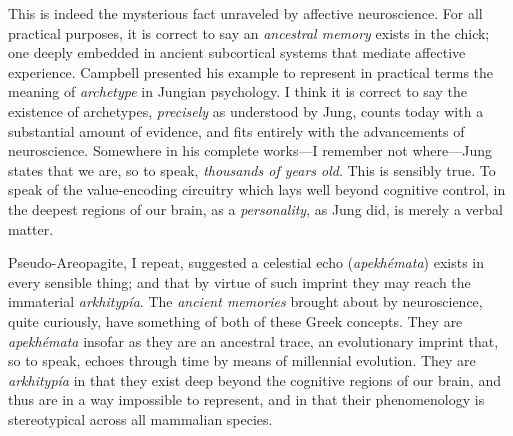 \documentclass[a4paper]{article}
\begin{document}
This is indeed the mysterious fact unraveled by affective neuroscience. For all
practical purposes, it is correct to say an \textit{ancestral memory} exists in
the chick; one deeply embedded in ancient subcortical systems that mediate
affective experience. Campbell presented his example to represent in practical
terms the meaning of \textit{archetype} in Jungian psychology. I think it is
correct to say the existence of archetypes, \textit{precisely} as understood by
Jung, counts today with a substantial amount of evidence, and fits entirely with
the advancements of neuroscience. Somewhere in his complete works---I remember
not where---Jung states that we are, so to speak, \textit{thousands of years
old}. This is sensibly true. To speak of the value-encoding circuitry which lays
well beyond cognitive control, in the deepest regions of our brain, as a
\textit{personality}, as Jung did, is merely a verbal matter. 

Pseudo-Areopagite, I repeat, suggested a celestial echo (\textit{apekhémata})
exists in every sensible thing; and that by virtue of such imprint they may
reach the immaterial \textit{arkhitypía}. The \textit{ancient memories} brought
about by neuroscience, quite curiously, have something of both of these Greek
concepts. They are \textit{apekhémata} insofar as they are an ancestral trace, an
evolutionary imprint that, so to speak, echoes through
time by means of millennial evolution. They are \textit{arkhitypía} in that they
exist deep beyond the cognitive regions of our brain, and thus are in a way
impossible to represent, and in that their phenomenology is stereotypical across
all mammalian species.
\end{document}
